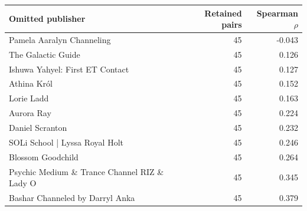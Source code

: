 \begin{tabular}{@{}lrr@{}}
\toprule
Omitted publisher & Retained pairs & Spearman $\rho$ \\
\midrule
Pamela Aaralyn Channeling & 45 & -0.043 \\
The Galactic Guide & 45 & 0.126 \\
Ishuwa Yahyel: First ET Contact & 45 & 0.127 \\
Athina Król & 45 & 0.152 \\
Lorie Ladd & 45 & 0.163 \\
Aurora Ray & 45 & 0.224 \\
Daniel Scranton & 45 & 0.232 \\
SOLi School | Lyssa Royal Holt & 45 & 0.246 \\
Blossom Goodchild & 45 & 0.264 \\
Psychic Medium \& Trance Channel RIZ \& Lady O & 45 & 0.345 \\
Bashar Channeled by Darryl Anka & 45 & 0.379 \\
\bottomrule
\end{tabular}
